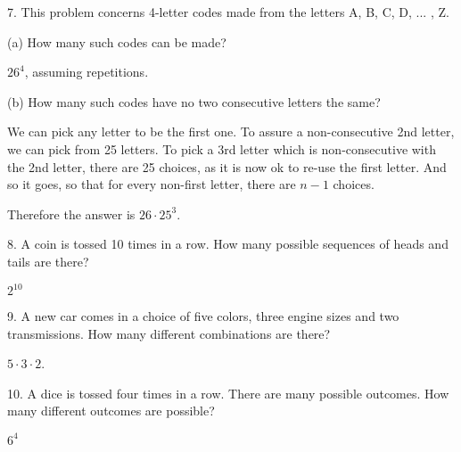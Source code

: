 \documentclass{idrisMemo}
\begin{document}
\begin{prooflist}{ 7. This problem concerns 4-letter codes made from the letters
    A, B, C, D, ... , Z. }
\item (a) How many such codes can be made?
\item $26^4$, assuming repetitions.
\item (b) How many such codes have no two consecutive letters the same?
\item We can pick any letter to be the first one. To assure a non-consecutive
    2nd letter, we can pick from 25 letters.  To pick a 3rd letter which is
    non-consecutive with the 2nd letter, there are 25 choices, as it is now ok
    to re-use the first letter. And so it goes, so that for every non-first
    letter, there are $n-1$ choices.
\item Therefore the answer is $26\cdot 25^3$.
\end{prooflist}

\begin{prooflist}{8. A coin is tossed 10 times in a row. How many possible
    sequences of heads and tails are there? }
\item $2^{10}$
\end{prooflist}

\begin{prooflist} {9. A new car comes in a choice of five colors, three engine
    sizes and two transmissions. How many different combinations are there?}
\item $5 \cdot 3 \cdot 2$.
\end{prooflist}

\begin{prooflist}{ 10. A dice is tossed four times in a row. There are many
    possible outcomes. How many different outcomes are possible?}
\item $ 6^4$
\end{prooflist}
\end{document}
